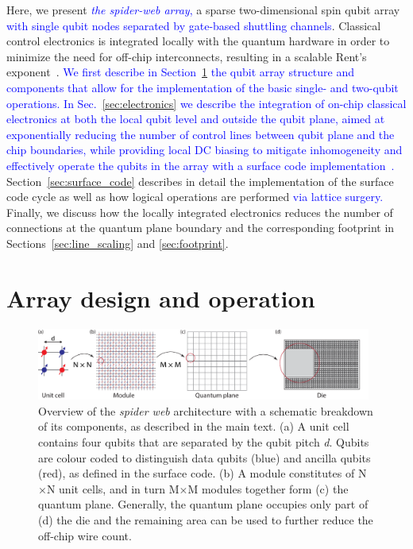 \documentclass[aps,prl,reprint,superscriptaddress,floatfix]{revtex4-1}
\begin{document}
Here, we present \textcolor{blue}{\textit{the spider-web array},} a sparse two-dimensional spin qubit array \textcolor{blue}{with single qubit nodes separated by gate-based shuttling channels}.
Classical control electronics is integrated locally with the quantum hardware in order to minimize the need for off-chip interconnects, resulting in a scalable Rent’s exponent~\cite{Franke2019}.
\textcolor{blue}{We first describe in Section~\ref{sec:array_design} the qubit array structure and components that allow for the implementation of the basic single- and two-qubit operations.}
\textcolor{blue}{In Sec.~\ref{sec:electronics} we describe the integration of on-chip classical electronics at both the local qubit level and outside the qubit plane, aimed at exponentially reducing the number of control lines between qubit plane and the chip boundaries, while providing local DC biasing to mitigate inhomogeneity and effectively operate the qubits in the array with a surface code implementation~\cite{Horsman2012}.}
Section~\ref{sec:surface_code} describes in detail the implementation of the surface code cycle as well as how logical operations are performed \textcolor{blue}{via lattice surgery.}
Finally, we discuss how the locally integrated electronics reduces the number of connections at the quantum plane boundary and the corresponding footprint in Sections~\ref{sec:line_scaling} and \ref{sec:footprint}.

\section{Array design and operation}
\label{sec:array_design}
\begin{figure}[t]
    \centering
    \includegraphics[width=0.98\textwidth]{Figure_1_array_schematic.pdf}
    \caption{Overview of the \textit{spider web} architecture with a schematic breakdown of its components, as described in the main text. (a) A unit cell contains four qubits that are separated by the qubit pitch \textit{d}. Qubits are colour coded to distinguish data qubits (blue) and ancilla qubits (red), as defined in the surface code. (b) A module constitutes of N$\times$N unit cells, and in turn M$\times$M modules together form (c) the quantum plane. Generally, the quantum plane occupies only part of (d) the die and the remaining area can be used to further reduce the off-chip wire count.}
    \label{fig:overview}
\end{figure}
\end{document}
